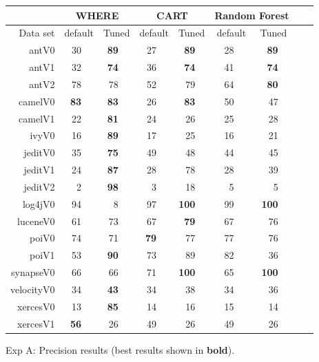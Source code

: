 \documentclass{acm_proc_article-sp}
\begin{document}
\begin{figure}[!b]
\renewcommand{\baselinestretch}{0.8} 
\newcommand{\rone}{}
\newcommand{\rtwo}{}
\newcommand{\rthree}{}
\newcommand{\rfour}{} 
\newcommand{\rfive}{}
\scriptsize    

\begin{tabular}{r|rl|rl|rl|rl|rl|rlrl}
      &   \multicolumn{4}{c|}{WHERE}         &   \multicolumn{4}{c|}{CART}         &   \multicolumn{4}{c}{Random Forest}         \\\hline
  Data set   &   \multicolumn{2}{c}{default}         &   \multicolumn{2}{c|}{Tuned}         &   \multicolumn{2}{c}{default}         &   \multicolumn{2}{c|}{Tuned}    &   \multicolumn{2}{c}{default}  &   \multicolumn{2}{c}{Tuned}\\\hline
antV0 & 30 &   & {\bf 89} &   & 27 &   & {\bf 89} &   & 28 &   & {\bf 89} &  \\
antV1 & 32 &   & {\bf 74} &   & 36 &   & {\bf 74} &   & 41 &   & {\bf 74} &  \\
antV2 & 78 &   & 78 &   & 52 &   & 79 &   & 64 &   & {\bf 80} &  \\
camelV0 & {\bf 83} &   & {\bf 83} &   & 26 &   & {\bf 83} &   & 50 &   & 47 &  \\
camelV1 & 22 &   & {\bf 81} &   & 24 &   & 26 &   & 25 &   & 28 &  \\
ivyV0 & 16 &   & {\bf 89} &   & 17 &   & 25 &   & 16 &   & 21 &  \\
jeditV0 & 35 &   & {\bf 75} &   & 49 &   & 48 &   & 44 &   & 45 &  \\
jeditV1 & 24 &   & {\bf 87} &   & 28 &   & 78 &   & 28 &   & 39 &  \\
jeditV2 & 2 &   & {\bf 98} &   & 3 &   & 18 &   & 5 &   & 5 &  \\
log4jV0 & 94 &   & 8 &   & 97 &   & {\bf 100} &   & 99 &   & {\bf 100} &  \\
luceneV0 & 61 &   & 73 &   & 67 &   & {\bf 79} &   & 67 &   & 76 &  \\
poiV0 & 74 &   & 71 &   & {\bf 79} &   & 77 &   & 77 &   & 76 &  \\
poiV1 & 53 &   & {\bf 90} &   & 73 &   & 89 &   & 82 &   & 36 &  \\
synapseV0 & 66 &   & 66 &   & 71 &   & {\bf 100} &   & 65 &   & {\bf 100} &  \\
velocityV0 & 34 &   & {\bf 43} &   & 34 &   & 38 &   & 34 &   & 36 &  \\
xercesV0 & 13 &   & {\bf 85} &   & 14 &   & 16 &   & 15 &   & 14 &  \\
xercesV1 & {\bf 56} &   & 26 &   & 49 &   & 26 &   & 49 &   & 26 &  \\


\end{tabular}
\caption{ Exp A: Precision results (best results  shown in {\bf bold}).}
\label{fig:precisionbars}
\end{figure}
\end{document}
